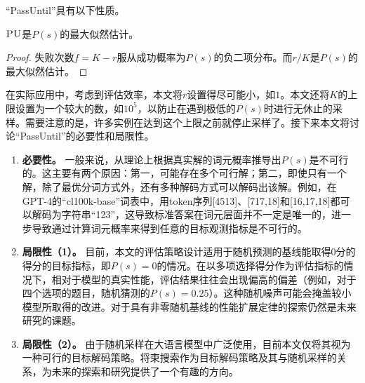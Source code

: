 “PassUntil”具有以下性质。
\begin{theorem}
$\textsc{PU}$是$P(s)$的最大似然估计。
\end{theorem}

\begin{proof}
失败次数$f = K - r$服从成功概率为$P(s)$的负二项分布。而$r/K$是$P(s)$的最大似然估计。
\end{proof}


在实际应用中，考虑到评估效率，本文将$r$设置得尽可能小，如$1$。本文还将$K$的上限设置为一个较大的数，如$10^5$，以防止在遇到极低的$P(s)$时进行无休止的采样。需要注意的是，许多实例在达到这个上限之前就停止采样了。接下来本文将讨论“PassUntil”的必要性和局限性。

\begin{enumerate}
    \item \textbf{必要性。} 一般来说，从理论上根据真实解的词元概率推导出$P(s)$是不可行的。这主要有两个原因：第一，可能存在多个可行解；第二，即使只有一个解，除了最优分词方式外，还有多种解码方式可以解码出该解。例如，在GPT-4的“cl100k-base”词表中，用token序列[4513]、[717,18]和[16,17,18]都可以解码为字符串“123”，这导致标准答案在词元层面并不一定是唯一的，进一步导致通过计算词元概率来得到任意的目标观测指标是不可行的。
    \item \textbf{局限性（1）。} 目前，本文的评估策略设计适用于随机预测的基线能取得0分的得分的目标指标，即$P(s) = 0$的情况。在以多项选择得分作为评估指标的情况下，相对于模型的真实性能，评估结果往往会出现偏高的偏差（例如，对于四个选项的题目，随机猜测的$P(s) = 0.25$）。这种随机噪声可能会掩盖较小模型所取得的改进。对于具有非零随机基线的性能扩展定律的探索仍然是未来研究的课题。
    \item \textbf{局限性（2）。} 由于随机采样在大语言模型中广泛使用，目前本文仅将其视为一种可行的目标解码策略。将束搜索作为目标解码策略及其与随机采样的关系，为未来的探索和研究提供了一个有趣的方向。 
\end{enumerate}


